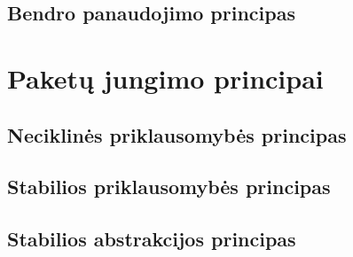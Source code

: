 \label{subsection:package:ccp}


\subsection{Bendro panaudojimo principas}

\label{subsection:package:crp}


\section{Paketų jungimo principai}

\subsection{Neciklinės priklausomybės principas}

\label{subsection:package:adp}


\subsection{Stabilios priklausomybės principas}

\label{subsection:package:sdp}


\subsection{Stabilios abstrakcijos principas}

\label{subsection:package:sap}

